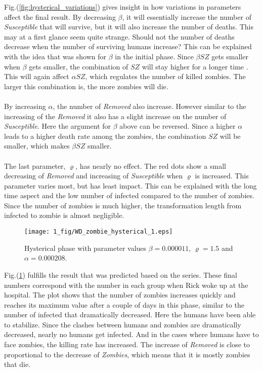 \documentclass[%
twoside,                 %
final,                   %
chapterprefix=true,      %
open=right               %
10pt]{book}
\begin{document}
Fig.(\ref{fig:hysterical_variations}) gives insight in how variations in parameters affect the final result. By decreasing $\beta$, it will essentially increase the number of \emph{Susceptible} that will survive, but it will also increase the number of deaths. This may at a first glance seem quite strange. Should not the number of deaths decrease when the number of surviving humans increase? This can be explained with the idea that was shown for $\beta$ in the initial phase. Since $\beta SZ$ gets smaller when $\beta$ gets smaller, the combination of $SZ$ will stay higher for a longer time . This will again affect $\alpha SZ$, which regulates the number of killed zombies. The larger this combination is, the more zombies will die. 
\\
\\
By increasing $\alpha$, the number of \emph{Removed} also increase. However similar to the increasing of the \emph{Removed} it also has a slight increase on the number of \emph{Susceptible}. Here the argument for $\beta$ above can be reversed. Since a higher $\alpha$ leads to a higher death rate among the zombies, the combination $SZ$ will be smaller, which makes $\beta SZ$ smaller.
\\
\\
The last parameter, $\varrho$, has nearly no effect. The red dots show a small decreasing of \emph{Removed} and increasing of \emph{Susceptible}  when $\varrho$ is increased. This parameter varies most, but has least impact. This can be explained with the long time aspect and the low number of infected compared to the number of zombies. Since the number of zombies is much higher, the transformation length from infected to zombie is almost negligible.  


\begin{figure}[ht]
  \centerline{\texttt{[image: 1\_fig/WD\_zombie\_hysterical\_1.eps]}}
  \caption{
  \label{fig:hysterical_1} Hysterical phase with parameter values $\beta = 0.000011$, $\varrho = 1.5$ and $\alpha = 0.000208$.
  }
\end{figure}


Fig.(\ref{fig:hysterical_1}) fulfills the result that was predicted based on the series. These final numbers correspond with the number in each group when Rick woke up at the hospital. The plot shows that the number of zombies increases quickly and reaches its maximum value after a couple of days in this phase, similar to the number of infected that dramatically decreased. Here the humans have been able to stabilize. Since the clashes between humans and zombies are dramatically decreased, nearly no humans get infected. And in the cases where humans have to face zombies, the killing rate has increased. The increase of \emph{Removed} is close to proportional to the decrease of \emph{Zombies}, which means that it is mostly zombies that die.
\end{document}
